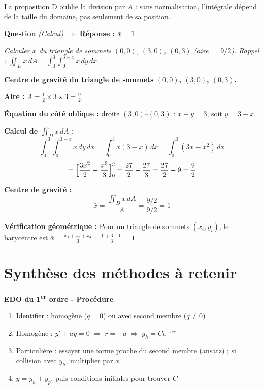 \documentclass[11pt,a4paper]{article}
\newcounter{qnum}
\newcommand{\qtitre}[2]{%
  \stepcounter{qnum}%
  \medskip\noindent
  \textbf{\color{bleutexte}Question \theqnum}\enspace
  \textit{(#1)}\enspace
  \textcolor{vertok}{\textbf{$\Rightarrow$ Réponse : #2}}
  \par\smallskip
}
\newcommand{\qenonce}[1]{%
  \begin{mdframed}[backgroundcolor=grisbox, linewidth=0pt,
    innerleftmargin=8pt, innerrightmargin=8pt,
    innertopmargin=5pt, innerbottommargin=5pt,
    skipabove=2pt, skipbelow=4pt]
  \small\textit{#1}
  \end{mdframed}
}
\begin{document}
La proposition D oublie la division par $A$ : sans normalisation, l'intégrale dépend de la taille du domaine, pas seulement de sa position.

\qtitre{Calcul}{$\bar{x} = 1$}
\qenonce{Calculer $\bar{x}$ du triangle de sommets $(0,0)$, $(3,0)$, $(0,3)$ (aire $= 9/2$). \textit{Rappel :} $\iint_D x\,dA = \int_0^3\!\int_0^{3-x} x\,dy\,dx$.}

\begin{reponsebox}
\textbf{Centre de gravité du triangle de sommets $(0,0)$, $(3,0)$, $(0,3)$.}

\textbf{Aire :} $A = \tfrac{1}{2}\times 3\times 3 = \tfrac{9}{2}$.

\textbf{Équation du côté oblique :} droite $(3,0)$--$(0,3)$ : $x + y = 3$, soit $y = 3-x$.

\textbf{Calcul de $\iint_D x\,dA$ :}
$$\int_0^3\!\int_0^{3-x} x\,dy\,dx = \int_0^3 x(3-x)\,dx = \int_0^3 (3x - x^2)\,dx$$
$$= \Bigl[\frac{3x^2}{2} - \frac{x^3}{3}\Bigr]_0^3 = \frac{27}{2} - \frac{27}{3} = \frac{27}{2} - 9 = \frac{9}{2}$$

\textbf{Centre de gravité :}
$$\bar{x} = \frac{\iint_D x\,dA}{A} = \frac{9/2}{9/2} = \boxed{1}$$

\textbf{Vérification géométrique :} Pour un triangle de sommets $(x_i, y_i)$, le barycentre est
$\bar{x} = \tfrac{x_1+x_2+x_3}{3} = \tfrac{0+3+0}{3} = 1$ \checkmark
\end{reponsebox}

\newpage
\section*{\color{bleutexte}Synthèse des méthodes à retenir}

\begin{methodebox}
\textbf{EDO du 1\textsuperscript{er} ordre - Procédure}
\begin{enumerate}[itemsep=2pt, topsep=2pt]
  \item Identifier : homogène ($q=0$) ou avec second membre ($q\neq 0$)
  \item Homogène : $y' + ay = 0 \;\Rightarrow\; r = -a \;\Rightarrow\; y_h = Ce^{-ax}$
  \item Particulière : essayer une forme proche du second membre (ansatz) ; si collision avec $y_h$, multiplier par $x$
  \item $y = y_h + y_p$, puis conditions initiales pour trouver $C$
\end{enumerate}
\end{methodebox}
\end{document}
